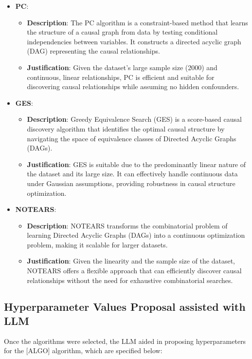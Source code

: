 \documentclass{article}
\begin{document}
\begin{itemize}

\item \textbf{PC}:
\begin{itemize}
    \item \textbf{Description}: The PC algorithm is a constraint-based method that learns the structure of a causal graph from data by testing conditional independencies between variables. It constructs a directed acyclic graph (DAG) representing the causal relationships.
    \item \textbf{Justification}: Given the dataset's large sample size (2000) and continuous, linear relationships, PC is efficient and suitable for discovering causal relationships while assuming no hidden confounders.
\end{itemize}

\item \textbf{GES}:
\begin{itemize}
    \item \textbf{Description}: Greedy Equivalence Search (GES) is a score-based causal discovery algorithm that identifies the optimal causal structure by navigating the space of equivalence classes of Directed Acyclic Graphs (DAGs).
    \item \textbf{Justification}: GES is suitable due to the predominantly linear nature of the dataset and its large size. It can effectively handle continuous data under Gaussian assumptions, providing robustness in causal structure optimization.
\end{itemize}

\item \textbf{NOTEARS}:
\begin{itemize}
    \item \textbf{Description}: NOTEARS transforms the combinatorial problem of learning Directed Acyclic Graphs (DAGs) into a continuous optimization problem, making it scalable for larger datasets.
    \item \textbf{Justification}: Given the linearity and the sample size of the dataset, NOTEARS offers a flexible approach that can efficiently discover causal relationships without the need for exhaustive combinatorial searches.
\end{itemize}

\end{itemize}

\subsection{Hyperparameter Values Proposal assisted with LLM}
Once the algorithms were selected, the LLM aided in proposing hyperparameters 
for the [ALGO] algorithm, which are specified below:
        
\end{document}

